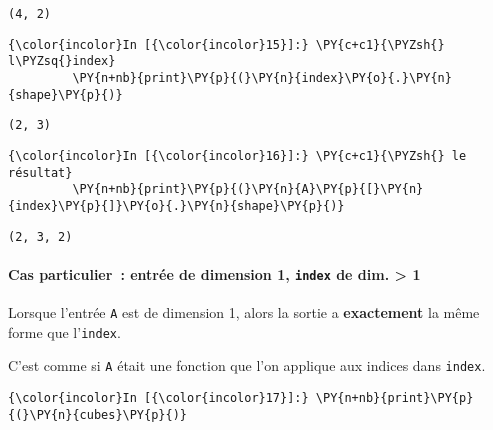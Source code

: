     \begin{Verbatim}[commandchars=\\\{\}]
(4, 2)

    \end{Verbatim}

    \begin{Verbatim}[commandchars=\\\{\}]
{\color{incolor}In [{\color{incolor}15}]:} \PY{c+c1}{\PYZsh{} l\PYZsq{}index}
         \PY{n+nb}{print}\PY{p}{(}\PY{n}{index}\PY{o}{.}\PY{n}{shape}\PY{p}{)}
\end{Verbatim}


    \begin{Verbatim}[commandchars=\\\{\}]
(2, 3)

    \end{Verbatim}

    \begin{Verbatim}[commandchars=\\\{\}]
{\color{incolor}In [{\color{incolor}16}]:} \PY{c+c1}{\PYZsh{} le résultat}
         \PY{n+nb}{print}\PY{p}{(}\PY{n}{A}\PY{p}{[}\PY{n}{index}\PY{p}{]}\PY{o}{.}\PY{n}{shape}\PY{p}{)}
\end{Verbatim}


    \begin{Verbatim}[commandchars=\\\{\}]
(2, 3, 2)

    \end{Verbatim}

    \hypertarget{cas-particulier-entruxe9e-de-dimension-1-index-de-dim.-1}{%
\paragraph{\texorpdfstring{Cas particulier~: entrée de dimension 1,
\texttt{index} de dim. \textgreater{}
1}{Cas particulier~: entrée de dimension 1, index de dim. \textgreater{} 1}}\label{cas-particulier-entruxe9e-de-dimension-1-index-de-dim.-1}}

Lorsque l'entrée \texttt{A} est de dimension 1, alors la sortie a
\textbf{exactement} la même forme que l'\texttt{index}.

C'est comme si \texttt{A} était une fonction que l'on applique aux
indices dans \texttt{index}.

    \begin{Verbatim}[commandchars=\\\{\}]
{\color{incolor}In [{\color{incolor}17}]:} \PY{n+nb}{print}\PY{p}{(}\PY{n}{cubes}\PY{p}{)}
\end{Verbatim}


